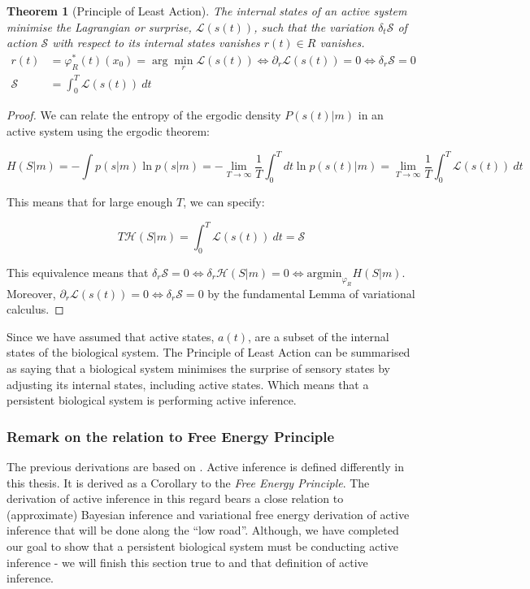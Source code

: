 \documentclass{article}
\newtheorem{theorem}{Theorem}
\begin{document}
\begin{theorem}[Principle of Least Action]\label{theorem:principle_of_least_action}
The internal states of an active system minimise the Lagrangian or surprise, $\mathcal{L}(s(t))$, such that the variation $\delta_t \mathcal{S}$ of action $\mathcal{S}$ with respect to its internal states vanishes $r(t) \in R$ vanishes.
$$
\begin{aligned}
r(t) & =\varphi_R^*(t)\left(x_0\right)=\arg \min _r \mathcal{L}(s(t)) \iff \partial_r \mathcal{L}(s(t))=0 \iff \delta_r \mathcal{S}=0 \\
\mathcal{S} & =\int_0^T \mathcal{L}(s(t)) \ dt
\end{aligned}
$$
\end{theorem}

\begin{proof}
	We can relate the entropy of the ergodic density $P(s(t) | m)$ in an active system using the ergodic theorem:
	
	$$
	H(S | m) = - \int p(s | m)\ln p(s | m) = - \lim_{T \to \infty} \frac{1}{T} \int_0^T dt \ln p(s(t) | m) = \lim_{T \to \infty} \frac{1}{T} \int_0^T \mathcal{L}(s(t)) \ dt
	$$
	
	This means that for large enough $T$, we can specify:
	
	$$
	T \mathcal{H}(S | m) = \int_0^T \mathcal{L}(s(t)) \ dt = \mathcal{S}
	$$
	
	This equivalence means that $\delta_r\mathcal{S} = 0 \iff \delta_r\mathcal{H}(S | m) = 0 \iff \text{argmin}_{\varphi_R} H(S | m)$. Moreover, $\partial_r \mathcal{L}(s(t)) = 0 \iff \delta_r \mathcal{S} = 0$ by the  fundamental Lemma of variational calculus.
\end{proof}

Since we have assumed that active states, $a(t)$, are a subset of the internal states of the biological system. The Principle of Least Action can be summarised as saying that a biological system minimises the surprise of sensory states by adjusting its internal states, including active states. Which means that a persistent biological system is performing active inference.

\subsubsection{Remark on the relation to Free Energy Principle}

The previous derivations are based on \citet{friston2012active}. Active inference is defined differently in this thesis. It is derived as a Corollary to the \textit{Free Energy Principle}. The derivation of active inference in this regard bears a close relation to (approximate) Bayesian inference and variational free energy derivation of active inference that will be done along the ``low road''. Although, we have completed our goal to show that a persistent biological system must be conducting active inference - we will finish this section true to \citet{friston2012free} and that definition of active inference.
\end{document}
